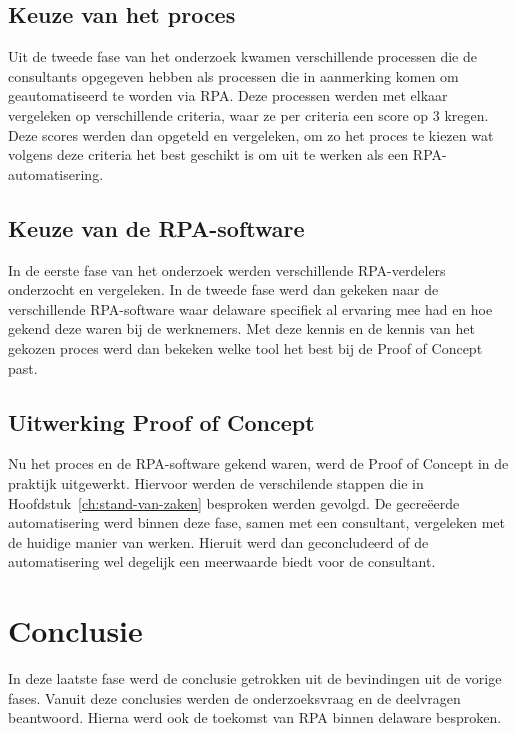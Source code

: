 \subsection{Keuze van het proces}
\label{subsec:keuze-proces}

Uit de tweede fase van het onderzoek kwamen verschillende processen die de consultants opgegeven hebben als processen die in aanmerking komen om geautomatiseerd te worden via RPA. Deze processen werden met elkaar vergeleken op verschillende criteria, waar ze per criteria een score op 3 kregen. Deze scores werden dan opgeteld en vergeleken, om zo het proces te kiezen wat volgens deze criteria het best geschikt is om uit te werken als een RPA-automatisering.

\subsection{Keuze van de RPA-software}
\label{subsec:keuze-software}

In de eerste fase van het onderzoek werden verschillende RPA-verdelers onderzocht en vergeleken. In de tweede fase werd dan gekeken naar de verschillende RPA-software waar delaware specifiek al ervaring mee had en hoe gekend deze waren bij de werknemers.
Met deze kennis en de kennis van het gekozen proces werd dan bekeken welke tool het best bij de Proof of Concept past.

\subsection{Uitwerking Proof of Concept}
\label{subsec:uitwerking-proof-of-concept}

Nu het proces en de RPA-software gekend waren, werd de Proof of Concept in de praktijk uitgewerkt. Hiervoor werden de verschilende stappen die in Hoofdstuk~\ref{ch:stand-van-zaken} besproken werden gevolgd.
De gecreëerde automatisering werd binnen deze fase, samen met een consultant, vergeleken met de huidige manier van werken. Hieruit werd dan geconcludeerd of de automatisering wel degelijk een meerwaarde biedt voor de consultant.

\section{Conclusie}
\label{sec:conclusie}

In deze laatste fase werd de conclusie getrokken uit de bevindingen uit de vorige fases. Vanuit deze conclusies werden de onderzoeksvraag en de deelvragen beantwoord. Hierna werd ook de toekomst van RPA binnen delaware besproken.